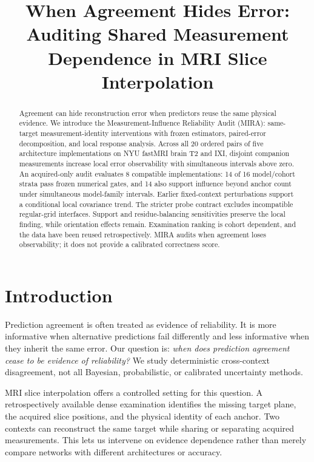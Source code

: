 \documentclass[10pt,twocolumn,letterpaper]{article}
\title{When Agreement Hides Error:\\
Auditing Shared Measurement Dependence in MRI Slice Interpolation}
\begin{document}
\maketitle

\begin{abstract}
Agreement can hide reconstruction error when predictors reuse the same physical evidence. We introduce the Measurement-Influence Reliability Audit (MIRA): same-target measurement-identity interventions with frozen estimators, paired-error decomposition, and local response analysis. Across all 20 ordered pairs of five architecture implementations on NYU fastMRI brain T2 and IXI, disjoint companion measurements increase local error observability with simultaneous intervals above zero. An acquired-only audit evaluates 8 compatible implementations: 14 of 16 model/cohort strata pass frozen numerical gates, and 14 also support influence beyond anchor count under simultaneous model-family intervals. Earlier fixed-context perturbations support a conditional local covariance trend. The stricter probe contract excludes incompatible regular-grid interfaces. Support and residue-balancing sensitivities preserve the local finding, while orientation effects remain. Examination ranking is cohort dependent, and the data have been reused retrospectively. MIRA audits when agreement loses observability; it does not provide a calibrated correctness score.
\end{abstract}

\section{Introduction}
Prediction agreement is often treated as evidence of reliability. It is more informative when alternative predictions fail differently and less informative when they inherit the same error. Our question is: \emph{when does prediction agreement cease to be evidence of reliability?} We study deterministic cross-context disagreement, not all Bayesian, probabilistic, or calibrated uncertainty methods.

MRI slice interpolation offers a controlled setting for this question. A retrospectively available dense examination identifies the missing target plane, the acquired slice positions, and the physical identity of each anchor. Two contexts can reconstruct the same target while sharing or separating acquired measurements. This lets us intervene on evidence dependence rather than merely compare networks with different architectures or accuracy.
\end{document}
